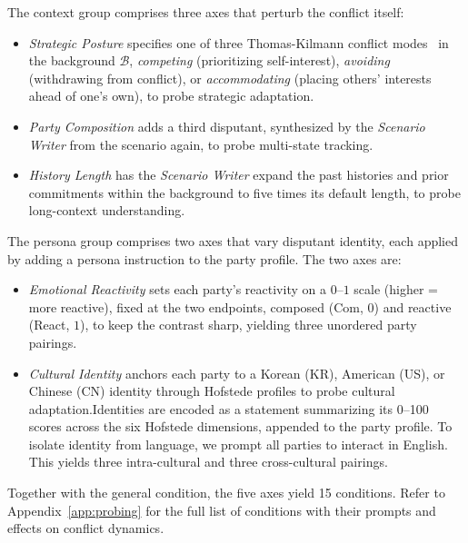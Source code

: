\documentclass{llmxive}
\begin{document}
The context group comprises three axes that perturb the conflict itself:
\begin{itemize}[leftmargin=*, noitemsep, topsep=2pt]
\item \emph{Strategic Posture} specifies one of three Thomas-Kilmann conflict modes~\citep{thomas2008thomas} in the background $\mathcal{B}$, \emph{competing} (prioritizing self-interest), \emph{avoiding} (withdrawing from conflict), or \emph{accommodating} (placing others' interests ahead of one's own), to probe strategic adaptation.
\item \emph{Party Composition} adds a third disputant, synthesized by the \textit{Scenario Writer} from the scenario again, to probe multi-state tracking.
\item \emph{History Length} has the \textit{Scenario Writer} expand the past histories and prior commitments within the background to five times its default length, to probe long-context understanding.
\end{itemize}



The persona group comprises two axes that vary disputant identity, each applied by adding a persona instruction to the party profile. The two axes are:
\begin{itemize}[leftmargin=*, noitemsep, topsep=2pt]
\item \emph{Emotional Reactivity} sets each party's reactivity on a $0$--$1$ scale (higher = more reactive), fixed at the two endpoints, composed (Com, $0$) and reactive (React, $1$), to keep the contrast sharp, yielding three unordered party pairings.
\item \emph{Cultural Identity} anchors each party to a Korean (KR), American (US), or Chinese (CN) identity through Hofstede profiles to probe cultural adaptation.\footnotemark[2] Identities are encoded as a statement summarizing its 0--100 scores across the six Hofstede dimensions, appended to the party profile. To isolate identity from language, we prompt all parties to interact in English. This yields three intra-cultural and three cross-cultural pairings.
\end{itemize}

Together with the general condition, the five axes yield 15 conditions. Refer to Appendix~\ref{app:probing} for the full list of conditions with their prompts and effects on conflict dynamics.
\end{document}
